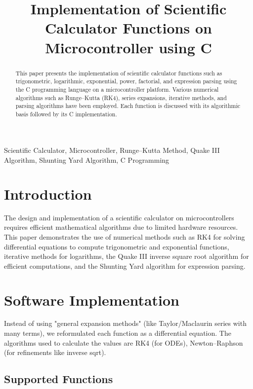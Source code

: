 \documentclass[conference]{IEEEtran}
\title{Implementation of Scientific Calculator Functions on Microcontroller using C}
\author{
\IEEEauthorblockN{Krishna Patil, Nara Prajwal}
\IEEEauthorblockA{
Department of Electrical Engineering\\
IIT Hyderabad\\
Email: ee24btech11036@iith.ac.in, ee24btech11051@iith.ac.in}
}
\begin{document}
\maketitle

\begin{abstract}
This paper presents the implementation of scientific calculator functions such as trigonometric, logarithmic, exponential, power, factorial, and expression parsing using the C programming language on a microcontroller platform. Various numerical algorithms such as Runge--Kutta (RK4), series expansions, iterative methods, and parsing algorithms have been employed. Each function is discussed with its algorithmic basis followed by its C implementation.
\end{abstract}

\begin{IEEEkeywords}
Scientific Calculator, Microcontroller, Runge--Kutta Method, Quake III Algorithm, Shunting Yard Algorithm, C Programming
\end{IEEEkeywords}

\section{Introduction}
The design and implementation of a scientific calculator on microcontrollers requires efficient mathematical algorithms due to limited hardware resources. This paper demonstrates the use of numerical methods such as RK4 for solving differential equations to compute trigonometric and exponential functions, iterative methods for logarithms, the Quake III inverse square root algorithm for efficient computations, and the Shunting Yard algorithm for expression parsing.

\section{Software Implementation}

Instead of using "general expansion methods" (like Taylor/Maclaurin series with many terms), we reformulated each function as a differential equation.
 The algorithms used to calculate the values are  RK4 (for ODEs), Newton–Raphson (for refinements like inverse sqrt).

 \subsection{Supported Functions}
\end{document}
